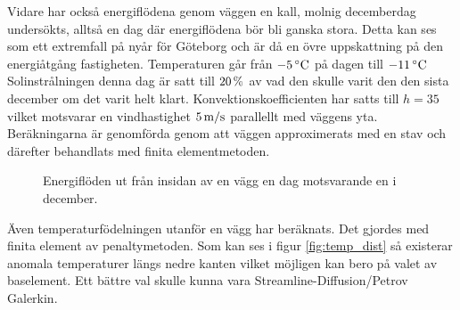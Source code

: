 Vidare har också energiflödena genom väggen en kall, molnig decemberdag undersökts, alltså en dag där energiflödena bör bli ganska stora. Detta kan ses som ett extremfall på nyår för Göteborg och är då en övre uppskattning på den energiåtgång fastigheten.
 Temperaturen går från $\unit[-5]{^\circ C}$ på dagen till $\unit[-11]{^\circ C}$ Solinstrålningen denna dag är satt till $\unit[20]{\%}$ av vad den skulle varit den den sista december om det varit helt klart. Konvektionskoefficienten har satts till $h=35$ vilket motsvarar en vindhastighet $\unit[5]{m/s}$ parallellt med väggens yta. Beräkningarna är genomförda genom att väggen approximerats med en stav och därefter behandlats med
finita elementmetoden.


\begin{figure}[hpbt]
\centering
{}\vspace{5mm}

\caption{Energiflöden ut från insidan av en vägg en dag motsvarande en i december.
}
\end{figure}


Även temperaturfödelningen utanför en vägg har beräknats. Det gjordes med finita element av penaltymetoden. %
Som kan ses i figur \ref{fig:temp_dist} så existerar anomala temperaturer längs nedre kanten vilket möjligen kan bero på valet av baselement. Ett bättre val skulle kunna vara Streamline-Diffusion/Petrov Galerkin. %

